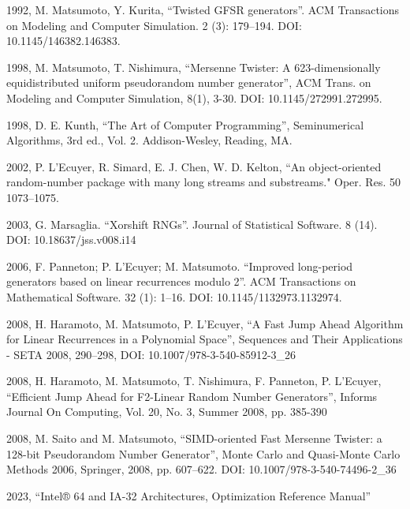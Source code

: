 \documentclass[preprint,1p,times]{elsarticle}
\begin{document}
\begin{thebibliography}{9}

 1992, M. Matsumoto, Y. Kurita, ``Twisted GFSR generators''. ACM Transactions on Modeling and Computer Simulation. 2 (3): 179--194. DOI: 10.1145/146382.146383.

 1998, M. Matsumoto, T. Nishimura, ``Mersenne Twister: A 623-dimensionally equidistributed uniform pseudorandom number generator'', ACM Trans. on Modeling and Computer Simulation, 8(1), 3-30. DOI: 10.1145/272991.272995.

 1998, D. E. Kunth, ``The Art of Computer Programming'', Seminumerical Algorithms, 3rd ed., Vol. 2. Addison-Wesley, Reading, MA.

 2002, P. L’Ecuyer, R. Simard, E. J. Chen, W. D. Kelton, ``An object-oriented random-number package with many long streams and substreams." Oper. Res. 50 1073--1075.

 2003, G. Marsaglia. ``Xorshift RNGs''. Journal of Statistical Software. 8 (14). DOI: 10.18637/jss.v008.i14

 2006, F. Panneton; P. L'Ecuyer; M. Matsumoto. ``Improved long-period generators based on linear recurrences modulo 2''. ACM Transactions on Mathematical Software. 32 (1): 1--16. DOI: 10.1145/1132973.1132974.

 2008, H. Haramoto, M. Matsumoto, P. L’Ecuyer, ``A Fast Jump Ahead Algorithm for Linear Recurrences in a Polynomial Space'', Sequences and Their Applications - SETA 2008, 290--298, DOI: 10.1007/978-3-540-85912-3\_26

 2008, H. Haramoto, M. Matsumoto, T. Nishimura, F. Panneton, P. L’Ecuyer, ``Efficient Jump Ahead for F2-Linear Random Number Generators'', Informs Journal On Computing, Vol. 20, No. 3, Summer 2008, pp. 385-390

 2008, M. Saito and M. Matsumoto, ``SIMD-oriented Fast Mersenne Twister: a 128-bit Pseudorandom Number Generator'', Monte Carlo and Quasi-Monte Carlo Methods 2006, Springer, 2008, pp. 607--622. DOI: 10.1007/978-3-540-74496-2\_36

 2023, ``Intel® 64 and IA-32 Architectures, Optimization Reference Manual''

\end{thebibliography}
\end{document}
